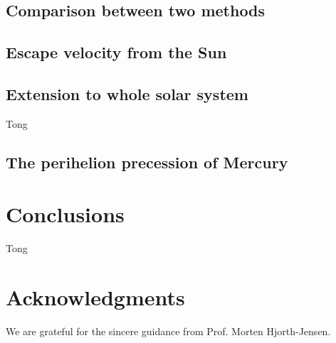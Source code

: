 \documentclass{article}
\begin{document}
	\subsection{Comparison between two methods}
	

	\subsection{Escape velocity from the Sun}
	
	
	\subsection{Extension to whole solar system}
	Tong
	
	\subsection{The perihelion precession of Mercury}
	
	
\section{Conclusions}\label{conclude}
Tong
	
	\section*{Acknowledgments}
	We are grateful for the sincere guidance from Prof. Morten Hjorth-Jensen. 
	
	\nocite{*} 
	
	
\end{document}

